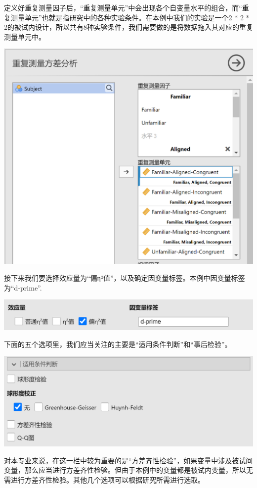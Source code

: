 \documentclass[]{ctexbook}
\theoremstyle{definition}
\theoremstyle{definition}
\theoremstyle{definition}
\theoremstyle{definition}
\theoremstyle{remark}
\begin{document}
定义好重复测量因子后，``重复测量单元''中会出现各个自变量水平的组合，而``重复测量单元''也就是指研究中的各种实验条件。在本例中我们的实验是一个2 * 2 * 2的被试内设计，所以共有8种实验条件，我们需要做的是将数据拖入其对应的重复测量单元中。

\includegraphics{img/jamovi/rmanova-factorlevels2.png}

接下来我们要选择效应量为``偏η²值''，以及确定因变量标签。本例中因变量标签为``d-prime''.

\includegraphics{img/jamovi/rmanova-dv.png}

下面的五个选项里，我们应当关注的主要是``适用条件判断''和``事后检验''。

\includegraphics{img/jamovi/rmanova-sphericity.png}

对本专业来说，在这一栏中较为重要的是``方差齐性检验''，如果变量中涉及被试间变量，那么应当进行方差齐性检验。但由于本例中的变量都是被试内变量，所以无需进行方差齐性检验。其他几个选项可以根据研究所需进行选取。
\end{document}
